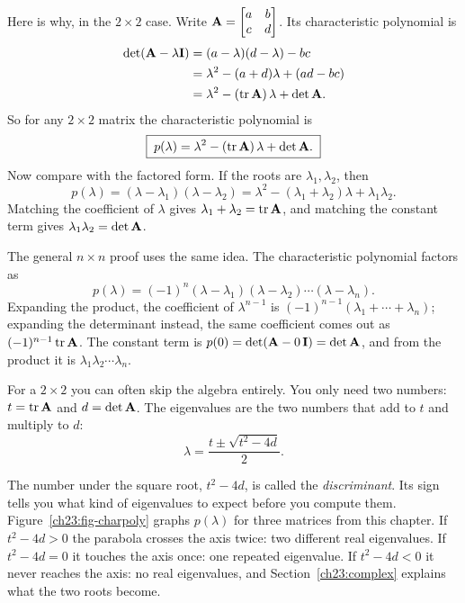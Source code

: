 Here is why, in the $2\times 2$ case. Write
$\mathbf{A}=\begin{bmatrix}a&b\\c&d\end{bmatrix}$. Its characteristic polynomial is
\begin{align*}
  \det(\mathbf{A}-\lambda\mathbf{I})
  &=(a-\lambda)(d-\lambda)-bc\\
  &=\lambda^2-(a+d)\lambda+(ad-bc)\\
  &=\lambda^2-(\operatorname{tr}\mathbf{A})\,\lambda+\det\mathbf{A}.
\end{align*}
So for any $2\times 2$ matrix the characteristic polynomial is
\[
  \boxed{\;p(\lambda)=\lambda^2-(\operatorname{tr}\mathbf{A})\,\lambda+\det\mathbf{A}.\;}
\]
Now compare with the factored form. If the roots are $\lambda_1,\lambda_2$, then
\[
  p(\lambda)=(\lambda-\lambda_1)(\lambda-\lambda_2)
  =\lambda^2-(\lambda_1+\lambda_2)\lambda+\lambda_1\lambda_2.
\]
Matching the coefficient of $\lambda$ gives
$\lambda_1+\lambda_2=\operatorname{tr}\mathbf{A}$, and matching the constant term gives
$\lambda_1\lambda_2=\det\mathbf{A}$.

The general $n\times n$ proof uses the same idea. The characteristic polynomial
factors as
\[
  p(\lambda)=(-1)^n(\lambda-\lambda_1)(\lambda-\lambda_2)\cdots(\lambda-\lambda_n).
\]
Expanding the product, the coefficient of $\lambda^{n-1}$ is
$(-1)^{n-1}(\lambda_1+\cdots+\lambda_n)$; expanding the determinant instead, the same
coefficient comes out as $(-1)^{n-1}\operatorname{tr}\mathbf{A}$. The constant term is
$p(0)=\det(\mathbf{A}-0\,\mathbf{I})=\det\mathbf{A}$, and from the product it is
$\lambda_1\lambda_2\cdots\lambda_n$.

\begin{focusbox}
For a $2\times 2$ you can often skip the algebra entirely. You only need two
numbers: $t=\operatorname{tr}\mathbf{A}$ and $d=\det\mathbf{A}$. The eigenvalues are the two numbers
that add to $t$ and multiply to $d$:
\[
  \lambda=\frac{t\pm\sqrt{t^2-4d}}{2}.
\]
\end{focusbox}

The number under the square root, $t^2-4d$, is called the \emph{discriminant}. Its
sign tells you what kind of eigenvalues to expect before you compute them.
Figure~\ref{ch23:fig-charpoly} graphs $p(\lambda)$ for three matrices from this
chapter. If $t^2-4d>0$ the parabola crosses the axis twice: two different real
eigenvalues. If $t^2-4d=0$ it touches the axis once: one repeated eigenvalue. If
$t^2-4d<0$ it never reaches the axis: no real eigenvalues, and
Section~\ref{ch23:complex} explains what the two roots become.

